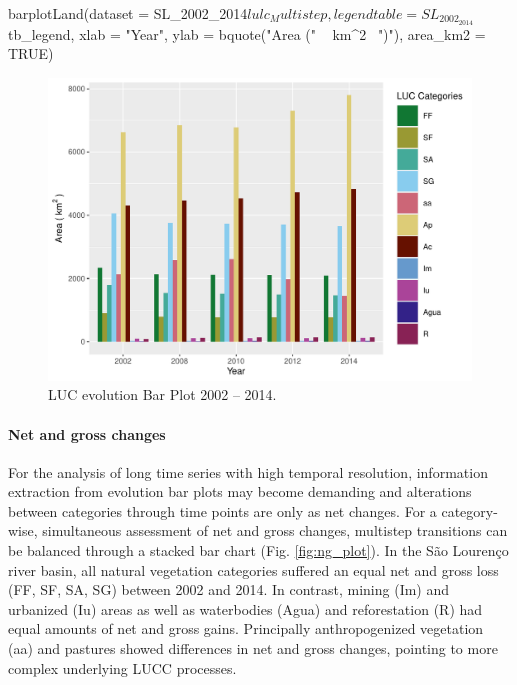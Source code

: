 \begin{Schunk}
\begin{Sinput}
barplotLand(dataset = SL_2002_2014$lulc_Multistep, 
            legendtable = SL_2002_2014$tb_legend,
            xlab = "Year",
            ylab = bquote("Area (" ~ km^2~ ")"),
            area_km2 = TRUE)
\end{Sinput}
\begin{figure}[htbp]

{\centering \includegraphics[width=0.7\linewidth,height=0.4\linewidth,trim={0 0.2cm 0 0.2cm},clip]{figures/barplotLand.pdf} 

}

\caption[LUC evolution Bar Plot 2002 – 2014]{LUC evolution Bar Plot 2002 – 2014.}\label{fig:evolution_plot}
\end{figure}
\end{Schunk}

\hypertarget{net-and-gross-changes}{%
\paragraph{Net and gross changes}\label{net-and-gross-changes}}

For the analysis of long time series with high temporal resolution,
information extraction from evolution bar plots may become demanding and
alterations between categories through time points are only as net
changes. For a category-wise, simultaneous assessment of net and gross
changes, multistep transitions can be balanced through a stacked bar
chart (Fig. \ref{fig:ng_plot}). In the São Lourenço river basin, all
natural vegetation categories suffered an equal net and gross loss (FF,
SF, SA, SG) between 2002 and 2014. In contrast, mining (Im) and
urbanized (Iu) areas as well as waterbodies (Agua) and reforestation (R)
had equal amounts of net and gross gains. Principally anthropogenized
vegetation (aa) and pastures showed differences in net and gross
changes, pointing to more complex underlying LUCC processes.

